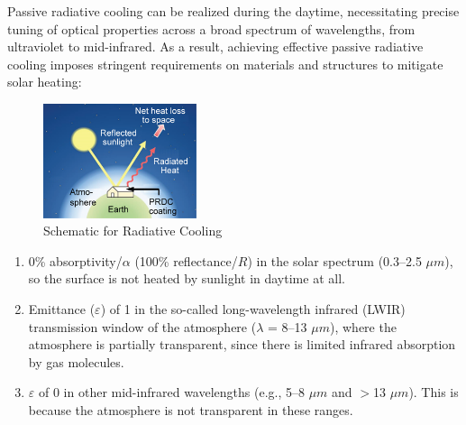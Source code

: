 Passive radiative cooling can be realized during the daytime, necessitating precise tuning of optical properties across a broad spectrum of wavelengths, from ultraviolet to mid-infrared. As a result, achieving effective passive radiative cooling imposes stringent requirements on materials and structures to mitigate solar heating: %

\begin{figure}
  \centering
  \includegraphics[width=0.4\textwidth]{Chapters/Figures/Schematic for Radiative Cooling.png}
  \caption{Schematic for Radiative Cooling}
\end{figure}

\begin{enumerate}
\item 0\% absorptivity/$\alpha$ (100\% reflectance/$R$) in the solar spectrum (0.3–2.5 $\mu m$), so the surface is not heated by sunlight in daytime at all.
\item Emittance ($\varepsilon$) of 1 in the so-called long-wavelength infrared (LWIR) transmission window of the atmosphere ($\lambda$ = 8–13 $\mu m$), where the atmosphere is partially transparent, since there is limited infrared absorption by gas molecules.
\item $\varepsilon$ of 0 in other mid-infrared wavelengths (e.g., 5–8 $\mu m$ and $>$13 $\mu m$). This is because the atmosphere is not transparent in these ranges.
\end{enumerate}
